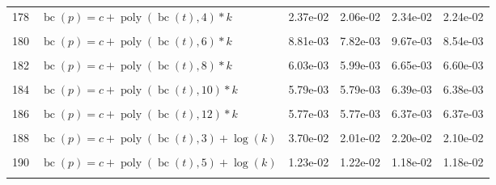 \documentclass[12pt,a4paper]{article}
\DeclareMathOperator{\bc}{bc}
\DeclareMathOperator{\poly}{poly}
\begin{document}
\begin{longtable}[t]{ll>{\raggedleft\arraybackslash}p{2cm}>{\raggedleft\arraybackslash}p{2cm}>{\raggedleft\arraybackslash}p{2cm}>{\raggedleft\arraybackslash}p{2cm}}
178 & $\bc(p) = c + \poly\left( \bc(t), 4 \right) * k$ & 2.37e-02 & 2.06e-02 & 2.34e-02 & 2.24e-02\\
\cellcolor{gray!6}{179} & \cellcolor{gray!6}{$\bc(p) = c + \poly\left( \bc(t), 5 \right) * k$} & \cellcolor{gray!6}{9.43e-03} & \cellcolor{gray!6}{9.42e-03} & \cellcolor{gray!6}{9.76e-03} & \cellcolor{gray!6}{9.75e-03}\\
180 & $\bc(p) = c + \poly\left( \bc(t), 6 \right) * k$ & 8.81e-03 & 7.82e-03 & 9.67e-03 & 8.54e-03\\
\cellcolor{gray!6}{181} & \cellcolor{gray!6}{$\bc(p) = c + \poly\left( \bc(t), 7 \right) * k$} & \cellcolor{gray!6}{6.74e-03} & \cellcolor{gray!6}{6.40e-03} & \cellcolor{gray!6}{7.08e-03} & \cellcolor{gray!6}{6.97e-03}\\
182 & $\bc(p) = c + \poly\left( \bc(t), 8 \right) * k$ & 6.03e-03 & 5.99e-03 & 6.65e-03 & 6.60e-03\\
\cellcolor{gray!6}{183} & \cellcolor{gray!6}{$\bc(p) = c + \poly\left( \bc(t), 9 \right) * k$} & \cellcolor{gray!6}{5.98e-03} & \cellcolor{gray!6}{5.95e-03} & \cellcolor{gray!6}{6.59e-03} & \cellcolor{gray!6}{6.56e-03}\\
184 & $\bc(p) = c + \poly\left( \bc(t), 10 \right) * k$ & 5.79e-03 & 5.79e-03 & 6.39e-03 & 6.38e-03\\
\cellcolor{gray!6}{185} & \cellcolor{gray!6}{$\bc(p) = c + \poly\left( \bc(t), 11 \right) * k$} & \cellcolor{gray!6}{5.79e-03} & \cellcolor{gray!6}{5.78e-03} & \cellcolor{gray!6}{6.39e-03} & \cellcolor{gray!6}{6.38e-03}\\
186 & $\bc(p) = c + \poly\left( \bc(t), 12 \right) * k$ & 5.77e-03 & 5.77e-03 & 6.37e-03 & 6.37e-03\\
\cellcolor{gray!6}{187} & \cellcolor{gray!6}{$\bc(p) = c + \poly\left( \bc(t), 13 \right) * k$} & \cellcolor{gray!6}{5.77e-03} & \cellcolor{gray!6}{5.77e-03} & \cellcolor{gray!6}{6.37e-03} & \cellcolor{gray!6}{6.36e-03}\\
188 & $\bc(p) = c + \poly\left( \bc(t), 3 \right) + \log(k)$ & 3.70e-02 & 2.01e-02 & 2.20e-02 & 2.10e-02\\
\cellcolor{gray!6}{189} & \cellcolor{gray!6}{$\bc(p) = c + \poly\left( \bc(t), 4 \right) + \log(k)$} & \cellcolor{gray!6}{2.63e-02} & \cellcolor{gray!6}{2.28e-02} & \cellcolor{gray!6}{2.52e-02} & \cellcolor{gray!6}{2.42e-02}\\
190 & $\bc(p) = c + \poly\left( \bc(t), 5 \right) + \log(k)$ & 1.23e-02 & 1.22e-02 & 1.18e-02 & 1.18e-02\\
\cellcolor{gray!6}{191} & \cellcolor{gray!6}{$\bc(p) = c + \poly\left( \bc(t), 6 \right) + \log(k)$} & \cellcolor{gray!6}{1.19e-02} & \cellcolor{gray!6}{1.11e-02} & \cellcolor{gray!6}{1.20e-02} & \cellcolor{gray!6}{1.10e-02}\\

\end{longtable}
\end{document}
